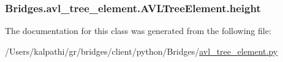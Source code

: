 \subsubsection[{height}]{\setlength{\rightskip}{0pt plus 5cm}Bridges.\+avl\+\_\+tree\+\_\+element.\+A\+V\+L\+Tree\+Element.\+height}\label{class_bridges_1_1avl__tree__element_1_1_a_v_l_tree_element_ad4e11b61cca78051aea548c7fcb4e4fb}


The documentation for this class was generated from the following file\+:\begin{DoxyCompactItemize}
\item 
/\+Users/kalpathi/gr/bridges/client/python/\+Bridges/\hyperlink{avl__tree__element_8py}{avl\+\_\+tree\+\_\+element.\+py}\end{DoxyCompactItemize}
